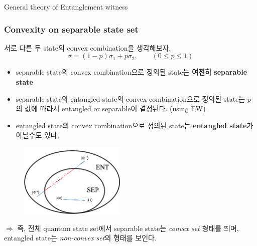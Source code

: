 \documentclass[9pt]{beamer}
\begin{document}
    \begin{section}{General theory of  Entanglement witness}
        \begin{frame}
            \frametitle{Convexity on separable state set}
            서로 다른 두 state의 convex combination을 생각해보자.
            \begin{equation*}
                \sigma = (1-p) \sigma_1 + p \sigma_2,\qquad (0 \le p \le 1)
            \end{equation*}
            \vspace{-0.2cm}
            \begin{itemize}
                \item separable state의 convex combination으로 정의된 state는 \textbf{여전히 separable state}
                \item separable state와 entangled state의 convex combination으로 정의된 state는 $p$의 값에 따라서 entangled or separable이 결정된다. (using EW)
                \item entangled state의 convex combination으로 정의된 state는 \textbf{entangled state}가 아닐수도 있다.
            \end{itemize}
            \begin{figure}
                \centering
                \includegraphics[width=0.45\textwidth]{image/L7_convexity.png}
            \end{figure}
            $\Rightarrow$ 즉, 전체 quantum state set에서 separable state는 \textit{convex set} 형태를 띄며, entangled state는 \textit{non-convex set}의 형태를 보인다.
        \end{frame}
        

\end{section}
\end{document}
